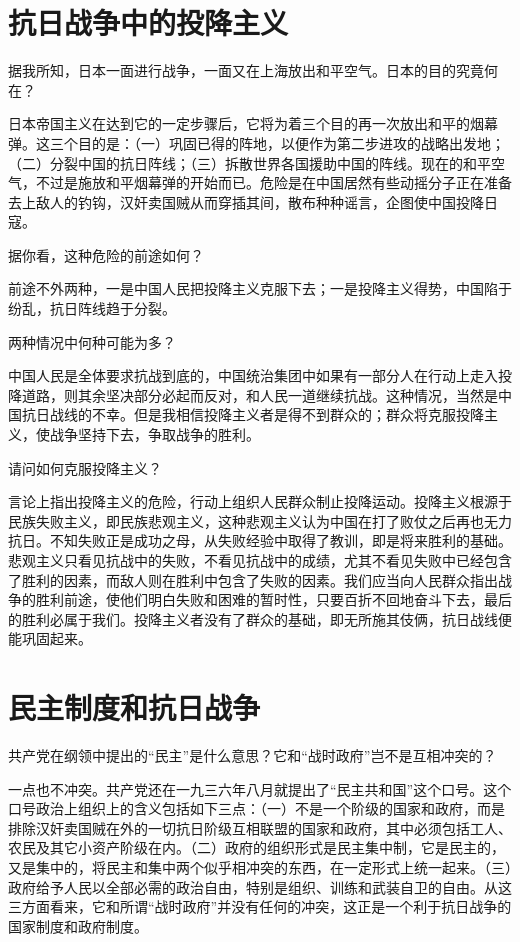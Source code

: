 \section{抗日战争中的投降主义}

据我所知，日本一面进行战争，一面又在上海放出和平空气。日本的目的究竟何在？

日本帝国主义在达到它的一定步骤后，它将为着三个目的再一次放出和平的烟幕弹。这三个目的是：（一）巩固已得的阵地，以便作为第二步进攻的战略出发地；（二）分裂中国的抗日阵线；（三）拆散世界各国援助中国的阵线。现在的和平空气，不过是施放和平烟幕弹的开始而已。危险是在中国居然有些动摇分子正在准备去上敌人的钓钩，汉奸卖国贼从而穿插其间，散布种种谣言，企图使中国投降日寇。

据你看，这种危险的前途如何？

前途不外两种，一是中国人民把投降主义克服下去；一是投降主义得势，中国陷于纷乱，抗日阵线趋于分裂。

两种情况中何种可能为多？

中国人民是全体要求抗战到底的，中国统治集团中如果有一部分人在行动上走入投降道路，则其余坚决部分必起而反对，和人民一道继续抗战。这种情况，当然是中国抗日战线的不幸。但是我相信投降主义者是得不到群众的；群众将克服投降主义，使战争坚持下去，争取战争的胜利。

请问如何克服投降主义？

言论上指出投降主义的危险，行动上组织人民群众制止投降运动。投降主义根源于民族失败主义，即民族悲观主义，这种悲观主义认为中国在打了败仗之后再也无力抗日。不知失败正是成功之母，从失败经验中取得了教训，即是将来胜利的基础。悲观主义只看见抗战中的失败，不看见抗战中的成绩，尤其不看见失败中已经包含了胜利的因素，而敌人则在胜利中包含了失败的因素。我们应当向人民群众指出战争的胜利前途，使他们明白失败和困难的暂时性，只要百折不回地奋斗下去，最后的胜利必属于我们。投降主义者没有了群众的基础，即无所施其伎俩，抗日战线便能巩固起来。

\section{民主制度和抗日战争}

共产党在纲领中提出的“民主”是什么意思？它和“战时政府”岂不是互相冲突的？

一点也不冲突。共产党还在一九三六年八月就提出了“民主共和国”这个口号。这个口号政治上组织上的含义包括如下三点：（一）不是一个阶级的国家和政府，而是排除汉奸卖国贼在外的一切抗日阶级互相联盟的国家和政府，其中必须包括工人、农民及其它小资产阶级在内。（二）政府的组织形式是民主集中制，它是民主的，又是集中的，将民主和集中两个似乎相冲突的东西，在一定形式上统一起来。（三）政府给予人民以全部必需的政治自由，特别是组织、训练和武装自卫的自由。从这三方面看来，它和所谓“战时政府”并没有任何的冲突，这正是一个利于抗日战争的国家制度和政府制度。

